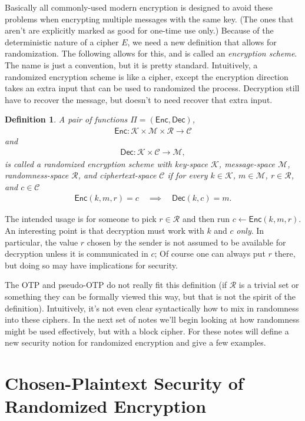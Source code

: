 \documentclass[11pt]{article}
\newtheorem{definition}{Definition}
\newcommand{\msgs}{\mathcal{M}}
\newcommand{\ctxts}{\mathcal{C}}
\newcommand{\keys}{\mathcal{K}}
\newcommand{\rands}{\mathcal{R}}
\newcommand{\Enc}{\mathsf{Enc}}
\newcommand{\Dec}{\mathsf{Dec}}
\begin{document}
Basically all commonly-used modern encryption is designed to avoid these
problems when encrypting multiple messages with the same key. (The ones that
aren't are explicitly marked as good for one-time use only.) Because of the
deterministic nature of a cipher $E$, we need a new definition that allows for
randomization. The following allows for this, and is called an \emph{encryption
scheme}. The name is just a convention, but it is pretty standard. Intuitively,
a randomized encryption scheme is like a cipher, except the encryption
direction takes an extra input that can be used to randomized the process.
Decryption still have to recover the message, but doesn't to need recover that
extra input.
\begin{definition}
    A pair of functions $\Pi=(\Enc,\Dec)$,
    \begin{align*}
        \Enc  : \keys\times\msgs\times\rands  \to  \ctxts 
    \end{align*}
    and
    \begin{align*}
        \Dec : \keys\times\ctxts \to \msgs,  
    \end{align*}
    is called a \emph{randomized encryption scheme with key-space $\keys$,
    message-space $\msgs$, randomness-space $\rands$, and ciphertext-space
    $\ctxts$} if for every $k\in\keys$, $m\in\msgs$, $r\in\rands$, and
    $c\in\ctxts$
    \begin{align*}
        \Enc(k,m,r)=c \quad \implies \quad \Dec(k,c)=m.
    \end{align*}
\end{definition}
The intended usage is for someone to pick $r\in\rands$ and then run
$c\gets\Enc(k,m,r)$. An interesting point is that decryption must work with $k$
and $c$ \emph{only}. In particular, the value $r$ chosen by the sender is not
assumed to be available for decryption unless it is communicated in $c$; Of
course one can always put $r$ there, but doing so may have implications for
security.

The OTP and pseudo-OTP do not really fit this definition (if $\rands$ is a
trivial set or something they can be formally viewed this way, but that is not
the spirit of the definition). Intuitively, it's not even clear syntactically
how to mix in randomness into these ciphers. In the next set of notes we'll
begin looking at how randomness might be used effectively, but with a block
cipher. For these notes will define a new security notion for randomized
encryption and give a few examples.

\section{Chosen-Plaintext Security of Randomized Encryption}
\end{document}
